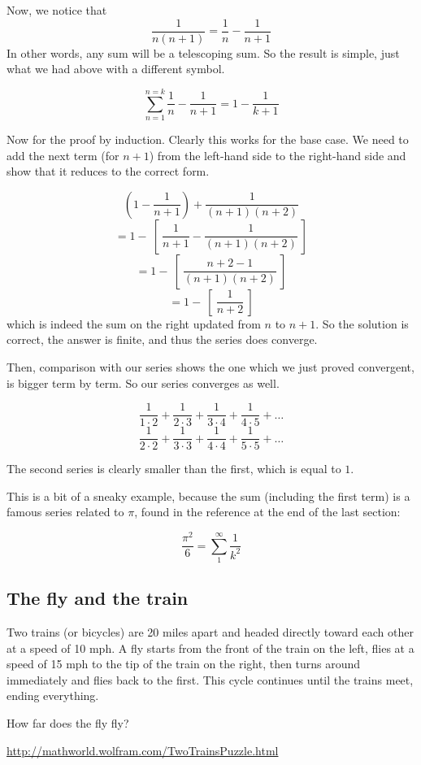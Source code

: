 \documentclass[11pt, oneside]{article}
\begin{document}
Now, we notice that
\[ \frac{1}{n(n+1)} = \frac{1}{n} - \frac{1}{n + 1} \]
In other words, any sum will be a telescoping sum.  So the result is simple, just what we had above with a different symbol.

\[ \sum_{n=1}^{n=k} \frac{1}{n} - \frac{1}{n + 1} = 1 - \frac{1}{k + 1} \]

Now for the proof by induction.  Clearly this works for the base case.  We need to add the next term (for $n+1$) from the left-hand side to the right-hand side and show that it reduces to the correct form.

\[ (1 - \frac{1}{n+1}) + \frac{1}{(n+1)(n+2)} \]
\[ = 1 - \ [ \ \frac{1}{n+1} - \frac{1}{(n+1)(n+2)} \ ]  \]
\[ = 1 - \ [ \ \frac{n + 2 - 1}{(n+1)(n+2)} \ ]  \]
\[ = 1 - \ [ \ \frac{1}{n+2} \ ]  \]
which is indeed the sum on the right updated from $n$ to $n+1$.  So the solution is correct, the answer is finite, and thus the series does converge.

Then, comparison with our series shows the one which we just proved convergent, is bigger term by term.  So our series converges as well.

\[ \frac{1}{1 \cdot 2} + \frac{1}{2 \cdot 3} + \frac{1}{3 \cdot 4} + \frac{1}{4 \cdot 5}  + \dots \]
\[ \frac{1}{2 \cdot 2} + \frac{1}{3 \cdot 3} + \frac{1}{4 \cdot 4} + \frac{1}{5 \cdot 5}  + \dots \]

The second series is clearly smaller than the first, which is equal to $1$.

This is a bit of a sneaky example, because the sum (including the first term) is a famous series related to $\pi$, found in the reference at the end of the last section:

\[ \frac{\pi^2}{6} = \sum_1^{\infty} \frac{1}{k^2} \]

\subsection*{The fly and the train}

Two trains (or bicycles) are 20 miles apart and headed directly toward each other at a speed of 10 mph. A fly starts from the front of the train on the left, flies at a speed of 15 mph to the tip of the train on the right, then turns around immediately and flies back to the first. This cycle continues until the trains meet, ending everything.

How far does the fly fly?

\url{http://mathworld.wolfram.com/TwoTrainsPuzzle.html}
\end{document}
